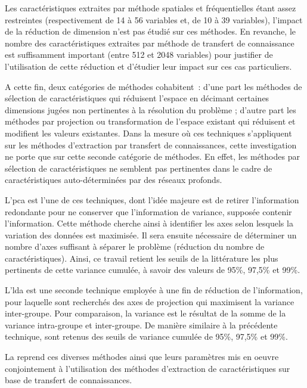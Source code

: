 Les caractéristiques extraites par méthode spatiales et fréquentielles étant assez restreintes (respectivement de 14 à 56 variables et, de 10 à 39 variables), l'impact de la réduction de dimension n'est pas étudié sur ces méthodes. En revanche, le nombre des caractéristiques extraites par méthode de transfert de connaissance est suffisamment important (entre 512 et 2048 variables) pour justifier de l'utilisation de cette réduction et d'étudier leur impact sur ces cas particuliers.\par

A cette fin, deux catégories de méthodes cohabitent~: d'une part les méthodes de sélection de caractéristiques qui réduisent l'espace en décimant certaines dimensions jugées non pertinentes à la résolution du problème ; d'autre part les méthodes par projection ou transformation de l'espace existant qui réduisent et modifient les valeurs existantes. Dans la mesure où ces techniques s'appliquent sur les méthodes d'extraction par transfert de connaissances, cette investigation ne porte que sur cette seconde catégorie de méthodes. En effet, les méthodes par sélection de caractéristiques ne semblent pas pertinentes dans le cadre de caractéristiques auto-déterminées par des réseaux profonds.\par

L'\gls{pca} est l'une de ces techniques, dont l'idée majeure est de retirer l'information redondante pour ne conserver que l'information de variance, supposée contenir l'information. Cette méthode cherche ainsi à identifier les axes selon lesquels la variation des données est maximisée. Il sera ensuite nécessaire de déterminer un nombre d'axes suffisant à séparer le problème (réduction du nombre de caractéristiques). Ainsi, ce travail retient les seuils de la littérature les plus pertinents de cette variance cumulée, à savoir des valeurs de 95\%, 97,5\% et 99\%.\par

L'\gls{lda} est une seconde technique employée à une fin de réduction de l'information, pour laquelle sont recherchés des axes de projection qui maximisent la variance inter-groupe. Pour comparaison, la variance est le résultat de la somme de la variance intra-groupe et inter-groupe. De manière similaire à la précédente technique, sont retenus des seuils de variance cumulée de 95\%, 97,5\% et 99\%.\par

La  reprend ces diverses méthodes ainsi que leurs paramètres mis en oeuvre conjointement à l'utilisation des méthodes d'extraction de caractéristiques sur base de transfert de connaissances.\par 

